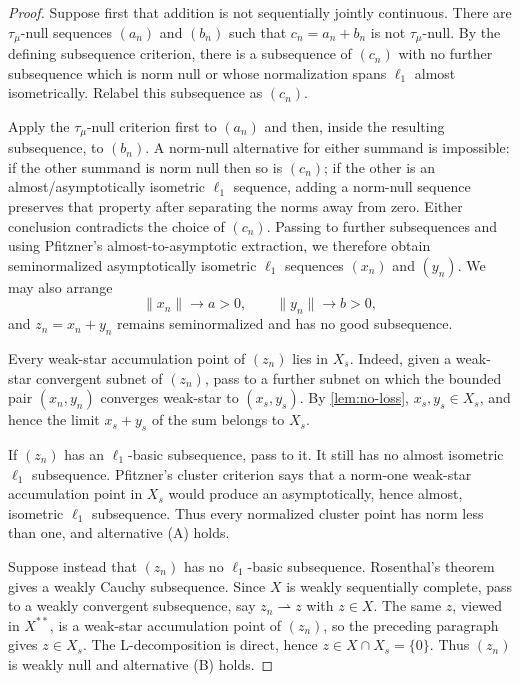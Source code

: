 \documentclass[11pt]{article}
\theoremstyle{definition}
\theoremstyle{remark}
\newcommand{\ellone}{\ell_1}
\newcommand{\taumu}{\tau_\mu}
\begin{document}
\begin{proof}
Suppose first that addition is not sequentially jointly continuous.  There
are $\taumu$-null sequences $(a_n)$ and $(b_n)$ such that
$c_n=a_n+b_n$ is not $\taumu$-null.  By the defining subsequence criterion,
there is a subsequence of $(c_n)$ with no further subsequence which is norm
null or whose normalization spans $\ellone$ almost isometrically.  Relabel
this subsequence as $(c_n)$.

Apply the $\taumu$-null criterion first to $(a_n)$ and then, inside the
resulting subsequence, to $(b_n)$.  A norm-null alternative for either
summand is impossible: if the other summand is norm null then so is $(c_n)$;
if the other is an almost/asymptotically isometric $\ellone$ sequence, adding
a norm-null sequence preserves that property after separating the norms away
from zero.  Either conclusion contradicts the choice of $(c_n)$.  Passing to
further subsequences and using Pfitzner's almost-to-asymptotic extraction, we
therefore obtain seminormalized asymptotically isometric $\ellone$ sequences
$(x_n)$ and $(y_n)$.  We may also arrange
\[
       \|x_n\|\to a>0,\qquad \|y_n\|\to b>0,
\]
and $z_n=x_n+y_n$ remains seminormalized and has no good subsequence.

Every weak-star accumulation point of $(z_n)$ lies in $X_s$.  Indeed, given
a weak-star convergent subnet of $(z_n)$, pass to a further subnet on which
the bounded pair $(x_n,y_n)$ converges weak-star to $(x_s,y_s)$.  By
\cref{lem:no-loss}, $x_s,y_s\in X_s$, and hence the limit
$x_s+y_s$ of the sum belongs to $X_s$.

If $(z_n)$ has an $\ellone$-basic subsequence, pass to it.  It still has no
almost isometric $\ellone$ subsequence.  Pfitzner's cluster criterion says
that a norm-one weak-star accumulation point in $X_s$ would produce an
asymptotically, hence almost, isometric $\ellone$ subsequence.  Thus every
normalized cluster point has norm less than one, and alternative (A) holds.

Suppose instead that $(z_n)$ has no $\ellone$-basic subsequence.  Rosenthal's
theorem gives a weakly Cauchy subsequence.  Since $X$ is weakly sequentially
complete, pass to a weakly convergent subsequence, say $z_n\rightharpoonup z$
with $z\in X$.  The same $z$, viewed in $X^{**}$, is a weak-star accumulation
point of $(z_n)$, so the preceding paragraph gives $z\in X_s$.  The
L-decomposition is direct, hence $z\in X\cap X_s=\{0\}$.  Thus $(z_n)$ is
weakly null and alternative (B) holds.


\end{proof}
\end{document}
